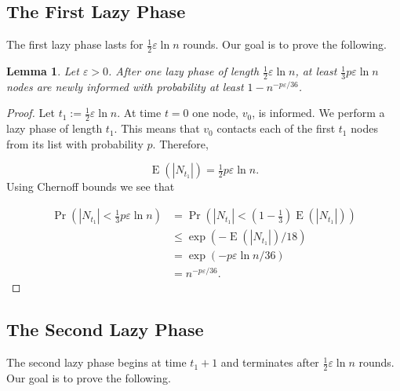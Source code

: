 \documentclass[12pt]{article}
\newtheorem{lemma}[theorem]{Lemma}
\newcommand{\e}{\varepsilon}
\DeclareMathOperator{\E}{E}
\begin{document}
{\subsection{The First Lazy Phase}

The first lazy phase lasts for $\frac{1}{2}\e\ln n$ rounds. 
Our goal is to prove the following.

\begin{lemma}\label{LazyPhase1}
Let $\e>0$. After one lazy phase of length $\frac{1}{2}\e\ln n$, at least $\frac{1}{3}p\e\ln n$ nodes are newly informed with probability at least $1-n^{-p\e/36}$.
\end{lemma}
\begin{proof}
Let $t_1:=\frac{1}{2}\e\ln n$. At time $t=0$ one node, $v_0$, is informed. We perform a lazy phase of length $t_1$. This means that $v_0$ contacts each of the first $t_1$ nodes from its list with probability $p$. Therefore, 
 
\begin{equation*}\E (|N_{t_1}|)=\tfrac{1}{2}p\e\ln n.
\end{equation*}
Using Chernoff bounds we see that

\begin{align*}
 \Pr\left(|N_{t_1}|< \tfrac{1}{3}p\e\ln n	\right)&= \Pr\left(|N_{t_1}|< \left(1-\tfrac{1}{3}\right)\E (|N_{t_1}|)\right)\\
& \leq \exp\left(-\E (|N_{t_1}|)/18	\right)\\
&= \exp\left(-p\e\ln n/36	\right)\\
&= n^{-p\e/36}.
\end{align*}
\end{proof}



\subsection{The Second Lazy Phase}

The second lazy phase begins at time $t_1+1$ and terminates after $\frac{1}{2}\e\ln n$ rounds.
Our goal is to prove the following.

}
\end{document}
